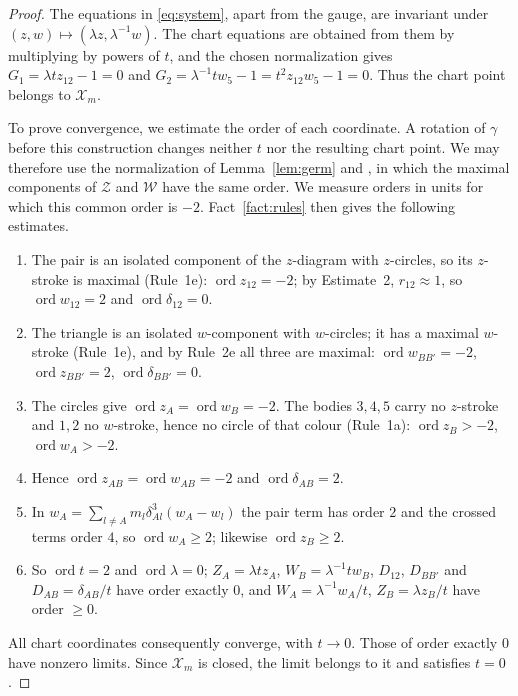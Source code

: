 \documentclass[Threeside,11pt]{article}
\theoremstyle{definition}
\theoremstyle{remark}
\numberwithin{equation}{section}
\theoremstyle{remark}
\newcommand{\ord}{\operatorname{ord}}
\begin{document}
\begin{proof}
{The equations in \eqref{eq:system}, apart from the gauge, are invariant
under $(z,w)\mapsto(\lambda z,\lambda^{-1}w)$.  The chart equations are obtained from them by
multiplying by powers of $t$, and the chosen normalization gives $G_1=\lambda tz_{12}-1=0$
and $G_2=\lambda^{-1}tw_5-1=t^2z_{12}w_5-1=0$.
Thus the chart point belongs to $\mathcal X_m$.

To prove convergence, we estimate the order of each coordinate.  A rotation of $\gamma$
before this construction changes neither $t$ nor the resulting chart point.
We may therefore use the normalization of Lemma~\ref{lem:germ} and \cite[p.~547]{AK}, in
which the maximal components of $\mathcal Z$ and $\mathcal W$ have the same order.
We measure orders in units for which this common order is $-2$.
Fact~\ref{fact:rules} then gives the following estimates.}
\begin{enumerate}
  \item The pair is an isolated component of the $z$-diagram with $z$-circles, so its $z$-stroke
  is maximal (Rule~1e): $\ord z_{12}=-2$; by Estimate~2, $r_{12}\approx1$, so $\ord w_{12}=2$ and
  $\ord\delta_{12}=0$.
  \item The triangle is an isolated $w$-component with $w$-circles; it has a maximal $w$-stroke
  (Rule~1e), and by Rule~2e all three are maximal: $\ord w_{BB'}=-2$, $\ord z_{BB'}=2$,
  $\ord\delta_{BB'}=0$.
  \item The circles give $\ord z_A=\ord w_B=-2$.  The bodies $3,4,5$ carry no $z$-stroke and
  $1,2$ no $w$-stroke, hence no circle of that colour (Rule~1a): $\ord z_B>-2$, $\ord w_A>-2$.
  \item Hence $\ord z_{AB}=\ord w_{AB}=-2$ and $\ord\delta_{AB}=2$.
  \item In $w_A=\sum_{l\ne A}m_l\delta_{Al}^3(w_A-w_l)$ the pair term has order $2$ and the
  crossed terms order $4$, so $\ord w_A\ge2$; likewise $\ord z_B\ge2$.
  \item So $\ord t=2$ and $\ord\lambda=0$; $Z_A=\lambda tz_A$, $W_B=\lambda^{-1}tw_B$, $D_{12}$,
  $D_{BB'}$ and $D_{AB}=\delta_{AB}/t$ have order exactly $0$, and $W_A=\lambda^{-1}w_A/t$,
  $Z_B=\lambda z_B/t$ have order $\ge0$.
\end{enumerate}
{All chart coordinates consequently converge, with $t\to0$.
Those of order exactly $0$ have nonzero limits.
Since $\mathcal X_m$ is closed, the limit belongs to it and satisfies $t=0$.}
\end{proof}
\end{document}
